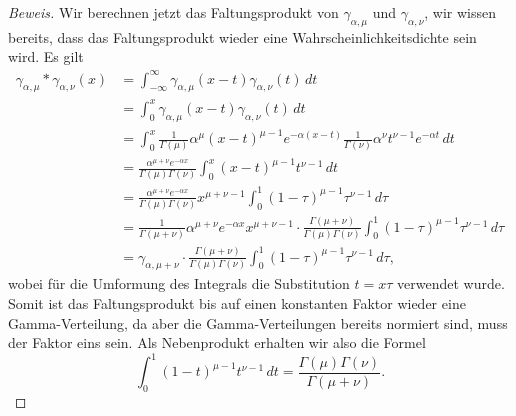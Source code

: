 {\begin{proof}[Beweis]
Wir berechnen jetzt das Faltungsprodukt von $\gamma_{\alpha,\mu}$ und
$\gamma_{\alpha,\nu}$, wir wissen bereits, dass das Faltungsprodukt wieder
eine Wahrscheinlichkeitsdichte sein wird.
Es gilt
\begin{align*}
\gamma_{\alpha,\mu}*\gamma_{\alpha,\nu}(x)
&=\int_{-\infty}^\infty \gamma_{\alpha,\mu}(x-t)\gamma_{\alpha,\nu}(t)\,dt\\
&=\int_0^x \gamma_{\alpha,\mu}(x-t)\gamma_{\alpha,\nu}(t)\,dt\\
&=\int_0^x \frac1{\Gamma(\mu)}\alpha^{\mu}(x-t)^{\mu-1}e^{-\alpha (x-t)}
\frac1{\Gamma(\nu)}\alpha^\nu t^{\nu-1}e^{-\alpha t}\,dt\\
&=\frac{\alpha^{\mu+\nu}e^{-\alpha x}}{\Gamma(\mu)\Gamma(\nu)}\int_0^x
(x-t)^{\mu-1}t^{\nu-1}\,dt\\
&=\frac{\alpha^{\mu+\nu}e^{-\alpha x}}{\Gamma(\mu)\Gamma(\nu)}x^{\mu+\nu-1}
\int_0^1 (1-\tau)^{\mu-1}\tau^{\nu-1}\,d\tau\\
&=
\frac1{\Gamma(\mu+\nu)}\alpha^{\mu+\nu}e^{-\alpha x}
x^{\mu+\nu-1}
\cdot
\frac{\Gamma(\mu+\nu)}{\Gamma(\mu)\Gamma(\nu)}
\int_0^1 (1-\tau)^{\mu-1}\tau^{\nu-1}\,d\tau\\
&=\gamma_{\alpha,\mu+\nu}
\cdot
\frac{\Gamma(\mu+\nu)}{\Gamma(\mu)\Gamma(\nu)}
\int_0^1 (1-\tau)^{\mu-1}\tau^{\nu-1}\,d\tau,
\end{align*}
wobei für die Umformung des Integrals die Substitution $t=x\tau$ verwendet
wurde.
Somit ist das Faltungsprodukt bis auf einen konstanten Faktor
wieder eine Gamma-Verteilung, da aber die Gamma-Verteilungen bereits
normiert sind, muss der Faktor eins sein. Als Nebenprodukt erhalten
wir also die Formel
\[
\int_0^1(1-t)^{\mu-1}t^{\nu-1}\,dt
=
\frac{\Gamma(\mu)\Gamma(\nu)}{\Gamma(\mu+\nu)}.
\]
\end{proof}

}
